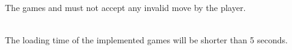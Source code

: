 \vspace{.5cm}

\begin{description}
	\item[] \textbf{} \\
	The games {\twixt} and {\graphcoloring} must not accept any invalid move by the player.
	\item[] \textbf{} \\
	The loading time of the implemented games will be shorter than 5 seconds. \\
\end{description}